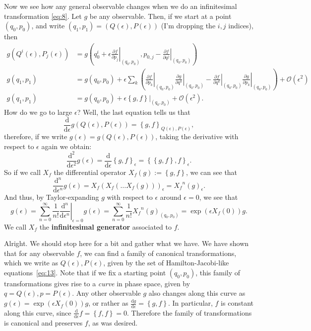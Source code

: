 \documentclass[11pt,a4]{article}
\newcommand{\de}{\mathrm{d}}
\newcommand{\tdev}[2]{\frac{\de #1}{\de #2}}
\newcommand{\pdev}[2]{\frac{\partial #1}{\partial #2}}
\newcommand{\set}[1]{\left\{#1\right\}}
\begin{document}
Now we see how any general observable
changes when we do an infinitesimal transformation \eqref{eq:8}. Let $g$ be any observable. Then,
if we start at a point $(q_0,p_0)$, and write $(q_1,p_1)=(Q(\epsilon),P(\epsilon))$ (I'm dropping the $i,j$ indices), then
\begin{equation}
  \label{eq:9}
    \begin{aligned}
    g\left(Q^i(\epsilon),P_j(\epsilon) \right) &= g\left(q_0^i+\epsilon \left.\pdev{f}{p_{j}}\right|_{(q_0,p_0)},p_{0,j}-\left.\pdev{f}{q^j}\right|_{(q_0,p_0)}\right)\\
    g(q_1,p_1)&= g\left(q_0,p_{0}\right) + \epsilon\sum_k\left(\left.\pdev{f}{p_{k}}\right|_{(q_0,p_0)}\left.\pdev{g}{q^k}\right|_{(q_0,p_0)} - \left.\pdev{f}{q^k}\right|_{(q_0,p_0)}\left.\pdev{g}{p_k}\right|_{(q_0,p_0)}\right) + \mathcal{O}(\epsilon^2)\\
    g(q_1,p_1)&= g\left(q_0,p_{0}\right) + \epsilon\left.\set{g,f}\right|_{(q_0,p_0)} +\mathcal{O}(\epsilon^2).
\end{aligned}
\end{equation}
How do we go to large $\epsilon$? Well, the last equation tells us that
\begin{equation}
  \tdev{}{\epsilon}g\left(Q(\epsilon),P(\epsilon)\right) = \set{g,f}_{Q(\epsilon),P(\epsilon)},
\end{equation}
therefore, if we write $g(\epsilon) = g(Q(\epsilon),P(\epsilon))$, taking the derivative with respect to $\epsilon$ again we obtain:
\begin{equation}
  \tdev{^2}{\epsilon^2}g\left(\epsilon\right) = \tdev{}{\epsilon}\set{g,f}_\epsilon = \set{\set{g,f},f}_\epsilon.
\end{equation}
So if we call $X_f$ the differential operator $X_f(g):=\set{g,f}$, we can see that
\begin{equation}
  \tdev{^n}{\epsilon^n}g\left(\epsilon\right) = X_f(X_f(\dots X_f(g)))_{\epsilon}={X_f}^n(g)_{\epsilon}.
\end{equation}
And thus, by Taylor-expanding $g$ with respect to $\epsilon$ around $\epsilon=0$, we see that
\begin{equation}
  \label{eq:12}
  g(\epsilon) = \sum_{n=0}^{\infty}\frac{1}{n!}\left.\tdev{^n}{\epsilon^n}\right|_{\epsilon=0}g(\epsilon) = \sum_{n=0}^{\infty}\frac{1}{n!}{X_f}^n(g)_{(q_0,p_0)} = \exp\left(\epsilon {X_f}(0)\right)g.
\end{equation}
We call $X_f$ the \textbf{infinitesimal generator} associated to $f$.

Alright. We should stop here for a bit and gather what we have. We have shown that for any observable $f$, we can find a family of
canonical transformations, which we write as $Q(\epsilon),P(\epsilon)$, given by the set of Hamilton-Jacobi-like equations~\eqref{eq:13}.
Note that if we fix a starting point $(q_0,p_0)$, this family of transformations gives rise to a \emph{curve} in phase space, given by
$q= Q(\epsilon),p=P(\epsilon)$.
Any other observable $g$ also changes along this curve as $g(\epsilon) = \exp(\epsilon X_f(0))g$, or rather as $\tdev{g}{\epsilon}=\set{g,f}$.
In particular, $f$ is constant along this curve, since $\tdev{}{\epsilon}f = \set{f,f}=0$. Therefore the family of transformations is
canonical and preserves $f$, as was desired.
\end{document}
